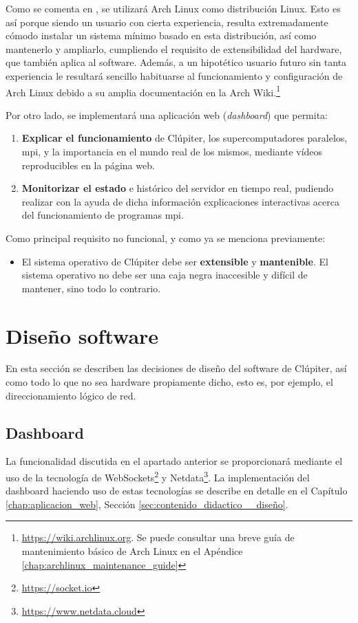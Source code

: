 Como se comenta en , se utilizará Arch Linux como distribución Linux. Esto es así porque siendo un usuario con cierta experiencia, resulta extremadamente cómodo instalar un sistema mínimo basado en esta distribución, así como mantenerlo y ampliarlo, cumpliendo el requisito de extensibilidad del hardware, que también aplica al software. Además, a un hipotético usuario futuro sin tanta experiencia le resultará sencillo habituarse al funcionamiento y configuración de Arch Linux debido a su amplia documentación en la Arch Wiki.\footnote{\url{https://wiki.archlinux.org}. Se puede consultar una breve guía de mantenimiento básico de Arch Linux en el Apéndice \ref{chap:archlinux_maintenance_guide}}

Por otro lado, se implementará una aplicación web (\textit{dashboard}) que permita:
\begin{enumerate}
    \item \textbf{Explicar el funcionamiento} de Clúpiter, los supercomputadores paralelos, \acrshort{mpi}, y la importancia en el mundo real de los mismos, mediante vídeos reproducibles en la página web.
    \item \textbf{Monitorizar el estado} e histórico del servidor en tiempo real, pudiendo realizar con la ayuda de dicha información explicaciones interactivas acerca del funcionamiento de programas \acrshort{mpi}.
\end{enumerate}

Como principal requisito no funcional, y como ya se menciona previamente:
\begin{itemize}
    \item El sistema operativo de Clúpiter debe ser \textbf{extensible} y \textbf{mantenible}. El sistema operativo no debe ser una caja negra inaccesible y difícil de mantener, sino todo lo contrario.
\end{itemize}

\section{Diseño software}
En esta sección se describen las decisiones de diseño del software de Clúpiter, así como todo lo que no sea hardware propiamente dicho, esto es, por ejemplo, el direccionamiento lógico de red.

\subsection{Dashboard}
La funcionalidad discutida en el apartado anterior se proporcionará mediante el uso de la tecnología de WebSockets\footnote{\url{https://socket.io}} y Netdata\footnote{\url{https://www.netdata.cloud}}. La implementación del dashboard haciendo uso de estas tecnologías se describe en detalle en el Capítulo \ref{chap:aplicacion_web}, Sección \ref{sec:contenido_didactico__diseño}.


